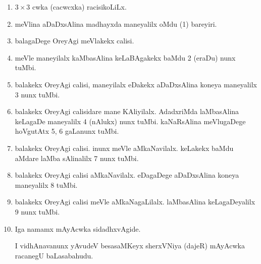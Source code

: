 \begin{enumerate}[{\rm 1)}]
\item  $3\times 3$ cwka (cacwcxka) racisikoLiLx.

\item meVlina aDaDxsAlina madhayxda maneyalilx oMdu {\rm (1)} bareyiri.

\item balagaDege OreyAgi meVlakekx calisi.

\item meVle maneyilalx kaMbasAlina keLaBAgakekx baMdu {\rm 2} (eraDu) nunx tuMbi.

\item balakekx OreyAgi calisi, maneyilalx eDakekx aDaDxsAlina koneya maneyalilx {\rm 3} nunx tuMbi.

\item balakekx OreyAgi calisidare mane KAliyilalx. AdadxriMda laMbasAlina keLagaDe maneyalilx {\rm 4} (nAlukx) nunx tuMbi. kaNaRsAlina meVlugaDege hoVgutAtx {\rm 5, 6} gaLanunx tuMbi.

\item balakekx OreyAgi calisi. inunx meVle aMkaNavilalx. keLakekx baMdu aMdare laMba sAlinalilx {\rm 7} nunx tuMbi.

\item balakekx OreyAgi calisi aMkaNavilalx. eDagaDege aDaDxsAlina koneya maneyalilx {\rm 8} tuMbi.

\item balakekx OreyAgi calisi meVle aMkaNagaLilalx. laMbasAlina keLagaDeyalilx {\rm 9} nunx tuMbi.

\item Iga namamx mAyAcwka sidadhxvAgide.

 I vidhAnavanunx yAvudeV besasaMKeyx sherxVNiya (dajeR) mAyAcwka racanegU baLasabahudu.
\end{enumerate}



